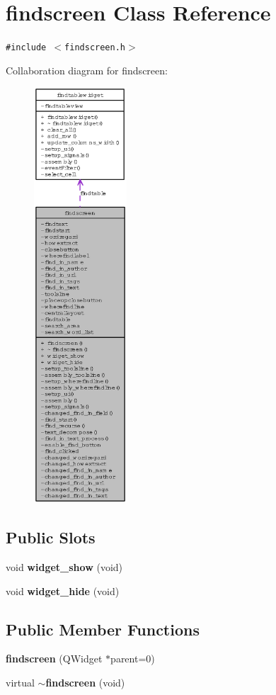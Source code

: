 \section{findscreen Class Reference}
\label{classfindscreen}
{\tt \#include $<$findscreen.h$>$}

Collaboration diagram for findscreen:\begin{figure}[H]
\begin{center}
\leavevmode
\includegraphics[width=98pt]{classfindscreen__coll__graph}
\end{center}
\end{figure}
\subsection*{Public Slots}
\begin{CompactItemize}
\item 
void {\bf widget\_\-show} (void)
\item 
void {\bf widget\_\-hide} (void)
\end{CompactItemize}
\subsection*{Public Member Functions}
\begin{CompactItemize}
\item 
{\bf findscreen} (QWidget $\ast$parent=0)
\item 
virtual {\bf $\sim$findscreen} (void)
\end{CompactItemize}
